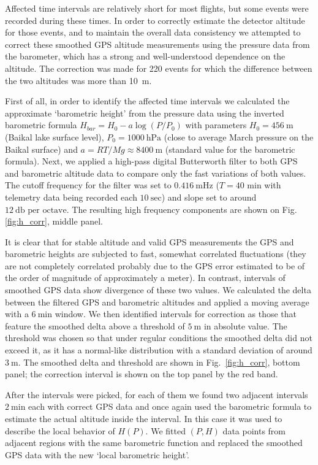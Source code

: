 \documentclass[final,5p,times,twocolumn]{elsarticle}
\begin{document}
Affected time intervals are relatively short for most flights, but some events were recorded during these times. In order to correctly estimate the detector altitude for those events, and to maintain the overall data consistency we attempted to correct these smoothed GPS altitude measurements using the pressure data from the barometer, which has a strong and well-understood dependence on the altitude. The correction was made for 220 events for which the difference between the two altitudes was more than 10~m.

First of all, in order to identify the affected time intervals we calculated the approximate `barometric height' from the pressure data using the inverted barometric formula $H_{bar} = H_0 - a \log (P/P_0)$ with parameters $H_0 = 456~\textrm{m}$ (Baikal lake surface level), $P_0 = 1000~\textrm{hPa}$ (close to average March pressure on the Baikal surface) and $a = {RT}/{Mg} \approx 8400~\textrm{m}$ (standard value for the barometric formula). Next, we applied a high-pass digital Butterworth filter to both GPS and barometric altitude data to compare only the fast variations of both values. The cutoff frequency for the filter was set to $0.416~\textrm{mHz}$ ($T=40$ min with telemetry data being recorded each $10~\textrm{sec}$) and slope set to around $12~\textrm{db per octave}$. The resulting high frequency components are shown on Fig. \ref{fig:h_corr}, middle panel.

It is clear that for stable altitude and valid GPS measurements the GPS and barometric heights are subjected to fast, somewhat correlated fluctuations (they are not completely correlated probably due to the GPS error estimated to be of the order of magnitude of approximately a meter). In contrast, intervals of smoothed GPS data show divergence of these two values. We calculated the delta between the filtered GPS and barometric altitudes and applied a moving average with a $6~\textrm{min}$ window. We then identified intervals for correction as those that feature the smoothed delta above a threshold of $5~\textrm{m}$ in absolute value. The threshold was chosen so that  under regular conditions the smoothed delta did not exceed it, as it has a normal-like distribution with a standard deviation of around $3~\textrm{m}$. The smoothed delta and threshold are shown in Fig.~\ref{fig:h_corr}, bottom panel; the correction interval is shown on the top panel by the red band.

After the intervals were picked, for each of them we found two adjacent intervals $2~\textrm{min}$ each with correct GPS data and once again used the barometric formula to estimate the actual altitude inside the interval. In this case it was used to describe the local behavior of $H(P)$. We fitted $(P, H)$ data points from adjacent regions with the same barometric function and replaced the smoothed GPS data with the new `local barometric height'.
\end{document}
